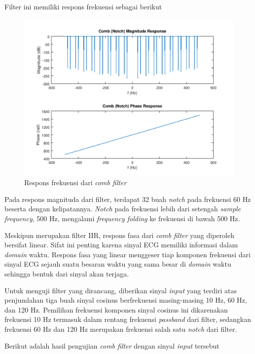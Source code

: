 \documentclass[11pt]{article}
\begin{document}
Filter ini memiliki respons frekuensi sebagai berikut

\begin{figure}[H]
\centerline{\includegraphics[scale=0.7]{figures/fig18-combfreqresp.png}}
\caption{Respons frekuensi dari \textit{comb filter}}
\label{combfreqresp}
\end{figure}

Pada respons magnituda dari filter, terdapat 32 buah \textit{notch} pada frekuensi 60 Hz beserta dengan kelipatannya. \textit{Notch} pada frekuensi lebih dari setengah \textit{sample frequency}, 500 Hz, mengalami \textit{frequency folding} ke frekuensi di bawah 500 Hz.

Meskipun merupakan filter IIR, respons fasa dari \textit{comb filter} yang diperoleh bersifat linear. Sifat ini penting karena sinyal ECG memiliki informasi dalam \textit{domain} waktu. Respons fasa yang linear menggeser tiap komponen frekuensi dari sinyal ECG sejauh suatu besaran waktu yang sama besar di \textit{domain} waktu sehingga bentuk dari sinyal akan terjaga.

Untuk menguji filter yang dirancang, diberikan sinyal \textit{input} yang terdiri atas penjumlahan tiga buah sinyal cosinus berfrekuensi masing-masing 10 Hz, 60 Hz, dan 120 Hz. Pemilihan frekuensi komponen sinyal cosinus ini dikarenakan frekuensi 10 Hz termasuk dalam rentang frekuensi \textit{passband} dari filter, sedangkan frekuensi 60 Hz dan 120 Hz merupakan frekuensi salah satu \textit{notch} dari filter.

Berikut adalah hasil pengujian \textit{comb filter} dengan sinyal \textit{input} tersebut
\end{document}
